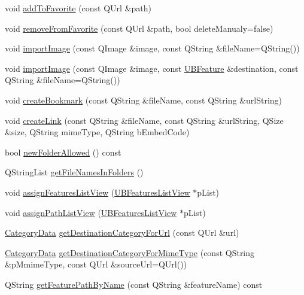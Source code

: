 \begin{DoxyCompactItemize}
\item 
void \hyperlink{class_u_b_features_controller_a72a3740e5a647048d439b6b75f7c2832}{add\-To\-Favorite} (const Q\-Url \&path)
\item 
void \hyperlink{class_u_b_features_controller_ac441a13d4bfca4a13e712cce6857bffc}{remove\-From\-Favorite} (const Q\-Url \&path, bool delete\-Manualy=false)
\item 
void \hyperlink{class_u_b_features_controller_aac768032f25aac61193518cfc41b73c7}{import\-Image} (const Q\-Image \&image, const Q\-String \&file\-Name=Q\-String())
\item 
void \hyperlink{class_u_b_features_controller_a7d71c50db359949131a49e2a1f46524f}{import\-Image} (const Q\-Image \&image, const \hyperlink{class_u_b_feature}{U\-B\-Feature} \&destination, const Q\-String \&file\-Name=Q\-String())
\item 
void \hyperlink{class_u_b_features_controller_acd936b126d7479f4e62b9f3e5ee218b3}{create\-Bookmark} (const Q\-String \&file\-Name, const Q\-String \&url\-String)
\item 
void \hyperlink{class_u_b_features_controller_abb30e018775b9f1b24af1417a95591f0}{create\-Link} (const Q\-String \&file\-Name, const Q\-String \&url\-String, Q\-Size \&size, Q\-String mime\-Type, Q\-String b\-Embed\-Code)
\item 
bool \hyperlink{class_u_b_features_controller_a2f82879667be84a5347dc31a00ea4f1e}{new\-Folder\-Allowed} () const 
\item 
Q\-String\-List \hyperlink{class_u_b_features_controller_a2138108a0bc480221b0344b015b53a28}{get\-File\-Names\-In\-Folders} ()
\item 
void \hyperlink{class_u_b_features_controller_a1c40c0f4a000cb60ac833b3e94dfa72a}{assign\-Features\-List\-View} (\hyperlink{class_u_b_features_list_view}{U\-B\-Features\-List\-View} $\ast$p\-List)
\item 
void \hyperlink{class_u_b_features_controller_ab8a74b048b8eedf66356e4f8cb2c8e3c}{assign\-Path\-List\-View} (\hyperlink{class_u_b_features_list_view}{U\-B\-Features\-List\-View} $\ast$p\-List)
\item 
\hyperlink{struct_category_data}{Category\-Data} \hyperlink{class_u_b_features_controller_ab872d9b6dbe6385003304a720aaa2d44}{get\-Destination\-Category\-For\-Url} (const Q\-Url \&url)
\item 
\hyperlink{struct_category_data}{Category\-Data} \hyperlink{class_u_b_features_controller_ae98f808560a2988579f61f6202debbbb}{get\-Destination\-Category\-For\-Mime\-Type} (const Q\-String \&p\-Mmime\-Type, const Q\-Url \&source\-Url=Q\-Url())
\item 
Q\-String \hyperlink{class_u_b_features_controller_a5169adfc9ae680be3e3218a6797f5d0a}{get\-Feature\-Path\-By\-Name} (const Q\-String \&feature\-Name) const 
\end{DoxyCompactItemize}
